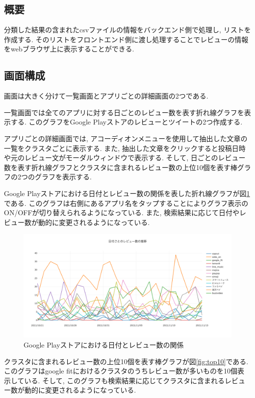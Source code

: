 \subsection{概要}
分類した結果の含まれたcsvファイルの情報をバックエンド側で処理し, リストを作成する. そのリストをフロントエンド側に渡し処理することでレビューの情報をwebブラウザ上に表示することができる. 

\subsection{画面構成}
画面は大きく分けて一覧画面とアプリごとの詳細画面の2つである. 

一覧画面では全てのアプリに対する日ごとのレビュー数を表す折れ線グラフを表示する. 
このグラフをGoogle Playストアのレビューとツイートの2つ作成する. 

アプリごとの詳細画面では, アコーディオンメニューを使用して抽出した文章の一覧をクラスタごとに表示する. また, 抽出した文章をクリックすると投稿日時や元のレビュー文がモーダルウィンドウで表示する. 
そして, 日ごとのレビュー数を表す折れ線グラフとクラスタに含まれるレビュー数の上位10個を表す棒グラフの2つのグラフを表示する. 

Google Playストアにおける日付とレビュー数の関係を表した折れ線グラフが図\ref{fig:google_graph}である. このグラフは右側にあるアプリ名をタップすることによりグラフ表示のON/OFFが切り替えられるようになっている. 
また, 検索結果に応じて日付やレビュー数が動的に変更されるようになっている. 

\begin{figure}[hbtp]
  \centering
  \includegraphics[scale=0.3]
    {contents/images/google_graph.png}
  \caption{Google Playストアにおける日付とレビュー数の関係\label{fig:google_graph}}
\end{figure}

クラスタに含まれるレビュー数の上位10個を表す棒グラフが図\ref{fig:top10}である. このグラフはgoogle fitにおけるクラスタのうちレビュー数が多いものを10個表示している. 
そして, このグラフも検索結果に応じてクラスタに含まれるレビュー数が動的に変更されるようになっている. 

